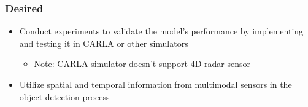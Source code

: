 \documentclass[rnd]{mas_proposal}
\begin{document}
\subsubsection*{Desired}
\begin{itemize}
    \item Conduct experiments to validate the model's performance by implementing and testing it in CARLA or other simulators
          \begin{itemize}
              \item Note: CARLA simulator doesn't support 4D radar sensor
          \end{itemize}
    \item Utilize spatial and temporal information from multimodal sensors in the object detection process


\end{itemize}


\nocite{*}

\end{document}
